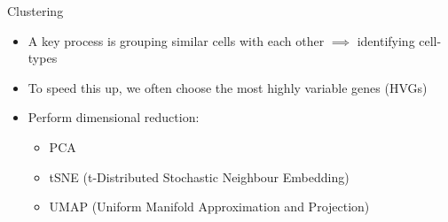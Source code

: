 \documentclass[aspectratio=169,11pt]{beamer}
\begin{document}
\begin{frame}{Clustering}

	\begin{itemize}
		\item A key process is grouping similar cells with each other $\implies$ identifying cell-types
		\item To speed this up, we often choose the most highly variable genes (HVGs)
		\item Perform dimensional reduction:
		\begin{itemize}
			\item PCA 
			\item tSNE (t-Distributed Stochastic Neighbour Embedding)
			\item UMAP (Uniform Manifold Approximation and Projection)
		\end{itemize}
	\end{itemize}

\end{frame}
\end{document}
